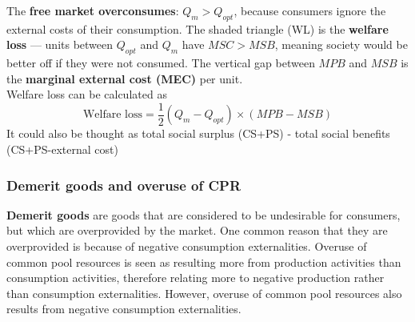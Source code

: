 \documentclass[a4paper,12pt]{article}
\newcommand{\needbold}[1]{\textcolor{red!70!black}{\textbf{#1}}}
\begin{document}
\begin{center}
\end{center}
The \textbf{free market overconsumes}: $Q_m > Q_{opt}$, because consumers ignore the external costs of their consumption. The shaded triangle (WL) is the \textbf{welfare loss} --- units between $Q_{opt}$ and $Q_m$ have $MSC > MSB$, meaning society would be better off if they were not consumed. The vertical gap between $MPB$ and $MSB$ is the \textbf{marginal external cost (MEC)} per unit.\\
Welfare loss can be calculated as
\[\text{Welfare loss}=\dfrac{1}{2}(Q_m-Q_{opt})\times (MPB-MSB)\]
It could also be thought as total social surplus (CS+PS) - total social benefits (CS+PS-external cost)
\subsubsection*{Demerit goods and overuse of CPR}
\needbold{Demerit goods} are goods that are considered to be undesirable for consumers, but which are overprovided by the market. One common reason that they are overprovided is because of negative consumption externalities. Overuse of common pool resources is seen as resulting more from production activities than consumption activities, therefore relating more to negative production rather than consumption externalities. However, overuse of common pool resources also results from negative consumption externalities.
\end{document}
